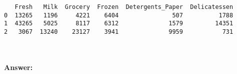 \documentclass[11pt]{article}
\begin{document}
    
    \begin{verbatim}
   Fresh   Milk  Grocery  Frozen  Detergents_Paper  Delicatessen
0  13265   1196     4221    6404               507          1788
1  43265   5025     8117    6312              1579         14351
2   3067  13240    23127    3941              9959           731
    \end{verbatim}

    
    \begin{center}
    \end{center}
    { \hspace*{\fill} \\}
    
    \paragraph{Answer:}\label{answer}
\end{document}
